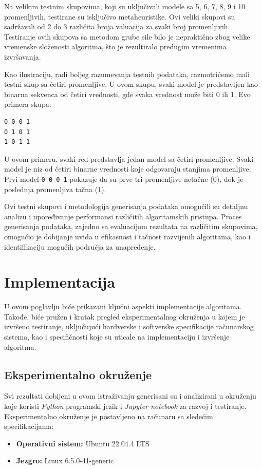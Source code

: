 \documentclass[12pt,oneside]{memoir}
\begin{document}
Na velikim testnim skupovima, koji su uključivali modele sa 5, 6, 7, 8, 9 i 10 promenljivih, testirane su isključivo metaheuristike. Ovi veliki skupovi su sadržavali od 2 do 3 različita broja valuacija za svaki broj promenljivih. Testiranje ovih skupova sa metodom grube sile bilo je nepraktično zbog velike vremenske složenosti algoritma, što je rezultiralo predugim vremenima izvršavanja. 

Kao ilustraciju, radi boljeg razumevanja testnih podataka, razmotrićemo mali testni skup sa četiri promenljive. U ovom skupu, svaki model je predstavljen kao binarna sekvenca od četiri vrednosti, gde svaka vrednost može biti 0 ili 1. Evo primera skupa:

\begin{verbatim}
0 0 0 1
0 1 0 1
1 0 1 1
\end{verbatim}

U ovom primeru, svaki red predstavlja jedan model sa četiri promenljive. Svaki model je niz od četiri binarne vrednosti koje odgovaraju stanjima promenljive. Prvi model \texttt{0 0 0 1} pokazuje da su prve tri promenljive netačne (0), dok je poslednja promenljiva tačna (1).


Ovi testni skupovi i metodologija generisanja podataka omogućili su detaljnu analizu i upoređivanje performansi različitih algoritamskih pristupa. Proces generisanja podataka, zajedno sa evaluacijom rezultata na različitim skupovima, omogućio je dobijanje uvida u efikasnost i tačnost razvijenih algoritama, kao i identifikaciju mogućih područja za unapređenje.

\chapter{Implementacija}
U ovom poglavlju biće prikazani ključni aspekti implementacije algoritama. Takođe, biće pružen i kratak pregled eksperimentalnog okruženja u kojem je izvršeno testiranje, uključujući hardverske i softverske specifikacije računarskog sistema, kao i specifičnosti koje su uticale na implementaciju i izvršenje algoritma.



\section{Eksperimentalno okruženje}
Svi rezultati dobijeni u ovom istraživanju generisani su i analizirani u okruženju koje koristi \textit{Python} programski jezik i \textit{Jupyter notebook} za razvoj i testiranje. Eksperimentalno okruženje je postavljeno na računaru sa sledećim specifikacijama:
\begin{itemize}
    \item \textbf{Operativni sistem:} Ubuntu 22.04.4 LTS
    \item \textbf{Jezgro:} Linux 6.5.0-41-generic
\end{itemize}
\end{document}
